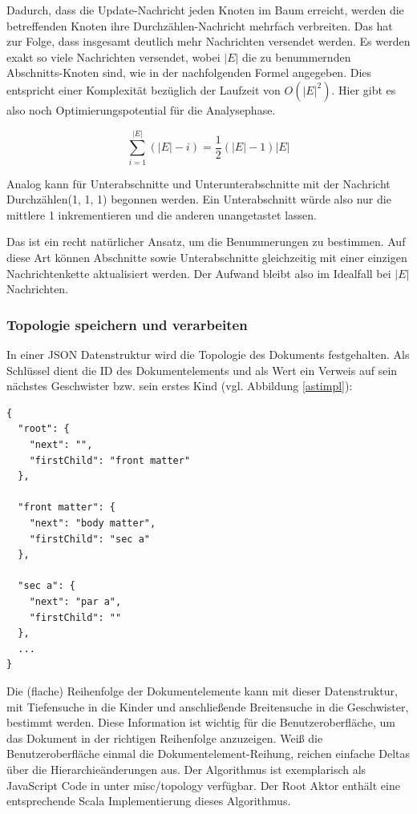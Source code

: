  
Dadurch, dass die Update-Nachricht jeden Knoten im Baum erreicht, werden die betreffenden Knoten ihre Durchzählen-Nachricht mehrfach verbreiten. Das hat zur Folge, dass insgesamt deutlich mehr Nachrichten versendet werden. Es werden exakt so viele Nachrichten versendet, wobei \(|E|\) die zu benummernden Abschnitts-Knoten sind, wie in der nachfolgenden Formel angegeben. Dies entspricht einer Komplexität bezüglich der Laufzeit von \(O(|E|^2)\). Hier gibt es also noch Optimierungspotential für die Analysephase.

 
$$\sum_{i=1}^{|E|}{\left( |E|-i \right)}=\frac{1}{2}\left( |E|-1 \right)|E|$$
 
Analog kann für Unterabschnitte und Unterunterabschnitte mit der Nachricht Durchzählen(1, 1, 1) begonnen werden. Ein Unterabschnitt würde also nur die mittlere 1 inkrementieren und die anderen unangetastet lassen.

 
Das ist ein recht natürlicher Ansatz, um die Benummerungen zu bestimmen. Auf diese Art können Abschnitte sowie Unterabschnitte gleichzeitig mit einer einzigen Nachrichtenkette aktualisiert werden. Der Aufwand bleibt also im Idealfall bei \(|E|\) Nachrichten.

 
\subsubsection{Topologie speichern und verarbeiten}\label{}

 
In einer JSON Datenstruktur wird die Topologie des Dokuments festgehalten. Als Schlüssel dient die ID des Dokumentelements und als Wert ein Verweis auf sein nächstes Geschwister bzw. sein erstes Kind (vgl. Abbildung \ref{astimpl}):

 
\begin{verbatim}
{
  "root": {
    "next": "",
    "firstChild": "front matter"
  },

  "front matter": {
    "next": "body matter",
    "firstChild": "sec a"
  },

  "sec a": {
    "next": "par a",
    "firstChild": ""
  },
  ...
}
\end{verbatim}
 
Die (flache) Reihenfolge der Dokumentelemente kann mit dieser Datenstruktur, mit Tiefensuche in die Kinder und anschließende Breitensuche in die Geschwister, bestimmt werden. Diese Information ist wichtig für die Benutzeroberfläche, um das Dokument in der richtigen Reihenfolge anzuzeigen. Weiß die Benutzeroberfläche einmal die Dokumentelement-Reihung, reichen einfache Deltas über die Hierarchieänderungen aus. Der Algorithmus ist exemplarisch als JavaScript Code in \citep{HodappScaltex} unter misc/topology verfügbar. Der Root Aktor enthält eine entsprechende Scala Implementierung dieses Algorithmus.

